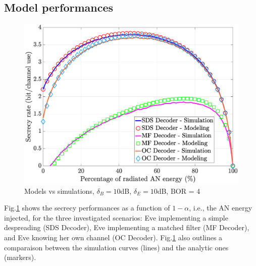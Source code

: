 \documentclass[journal,comsoc]{IEEEtran}
\let\MYoriglatexcaption\caption
\renewcommand{\caption}[2][\relax]{\MYoriglatexcaption[#2]{#2}}
\begin{document}
\subsection{Model performances}
\begin{figure}[h!t]
	\centering
	\includegraphics[width=1\linewidth]{graphs/SISO_SR_10dB.eps}
	\caption{Models vs simulations, $\delta_B = 10$dB,  $\delta_E = 10$dB, BOR = 4}
	\label{fig_modelvssimu}
\end{figure}
Fig.\ref{fig_modelvssimu} shows the secrecy performances as a function of $1-\alpha$, i.e., the AN energy injected, for the three investigated scenarios: Eve implementing a simple despreading (SDS Decoder), Eve implementing a matched filter (MF Decoder), and Eve knowing her own channel (OC Decoder). Fig.\ref{fig_modelvssimu} also outlines a comparaison between the simulation curves (lines) and the analytic ones (markers).
\end{document}
